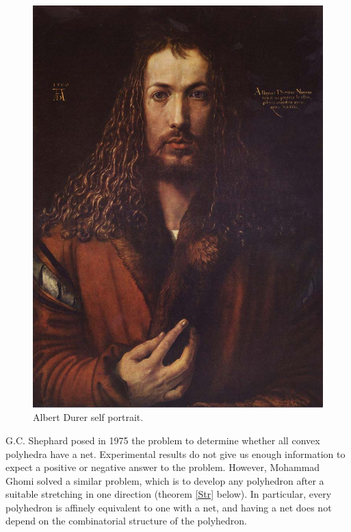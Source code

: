 \documentclass[openright, 12pt]{article}
\begin{document}
\begin{figure}[h]
\centering
\includegraphics[scale=0.2]{Durer.eps}
\caption{Albert Durer self portrait.}
\end{figure}










G.C. Shephard \cite{Sh} posed in 1975 the problem to determine whether all convex polyhedra have a net. Experimental results do not give us enough information to expect a positive or negative answer to the problem. However, Mohammad Ghomi solved a similar problem, which is to develop any polyhedron after a suitable stretching in one direction (theorem \ref{Str} below). In particular, every polyhedron is affinely equivalent to one with a net, and having a net does not depend on the combinatorial structure of the polyhedron. 
\end{document}
